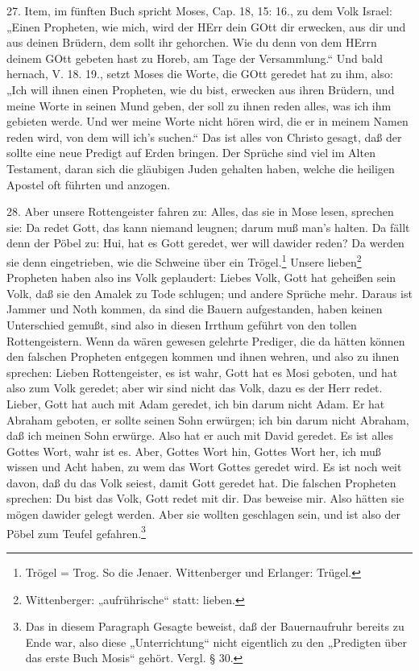 27. Item, im fünften Buch spricht Moses, Cap. 18, 15: 16., zu dem Volk Israel: „Einen Propheten, wie mich, wird der HErr dein GOtt dir erwecken, aus dir und aus deinen Brüdern, dem sollt ihr gehorchen. Wie du denn von dem HErrn deinem GOtt gebeten hast zu Horeb, am Tage der Versammlung.“ Und bald hernach, V. 18. 19., setzt Moses die Worte, die GOtt geredet hat zu ihm, also: „Ich will ihnen einen Propheten, wie du bist, erwecken aus ihren Brüdern, und meine Worte in seinen Mund geben, der soll zu ihnen reden alles, was ich ihm gebieten werde. Und wer meine Worte nicht hören wird, die er in meinem Namen reden wird, von dem will ich’s suchen.“ Das ist alles von Christo gesagt, daß der sollte eine neue Predigt auf Erden bringen. Der Sprüche sind viel im Alten
Testament, daran sich die gläubigen Juden gehalten haben, welche die heiligen Apostel oft führten und anzogen.

28. Aber unsere Rottengeister fahren zu: Alles, das sie in Mose lesen, sprechen sie: Da redet Gott, das kann niemand leugnen; darum muß man’s halten. Da fällt denn der Pöbel zu: Hui, hat es Gott geredet, wer will dawider reden? Da werden sie denn eingetrieben, wie die Schweine über ein Trögel.\footnote{Trögel = Trog. So die Jenaer. Wittenberger und Erlanger: Trügel.} Unsere lieben\footnote{Wittenberger: „aufrührische“ statt: lieben.} Propheten haben also ins Volk geplaudert: Liebes Volk, Gott hat geheißen sein Volk, daß sie den Amalek zu Tode schlugen; und andere Sprüche mehr. Daraus ist Jammer und Noth kommen, da sind die Bauern aufgestanden, haben keinen Unterschied gemußt, sind also in diesen Irrthum geführt von den tollen Rottengeistern. Wenn da wären gewesen gelehrte Prediger, die da hätten können den falschen Propheten entgegen kommen und ihnen wehren, und also zu ihnen sprechen: Lieben Rottengeister, es ist wahr, Gott hat es Mosi geboten, und hat also zum Volk geredet; aber wir sind nicht das Volk, dazu es der Herr redet. Lieber, Gott hat auch mit Adam geredet, ich bin darum nicht Adam. Er hat Abraham geboten, er sollte seinen Sohn erwürgen; ich bin darum nicht Abraham, daß ich meinen Sohn erwürge. Also hat er auch mit David geredet. Es ist alles Gottes Wort, wahr ist es. Aber, Gottes Wort hin, Gottes Wort her, ich muß wissen und Acht haben, zu wem das Wort Gottes geredet wird. Es ist noch weit davon, daß du das Volk seiest, damit Gott geredet hat. Die falschen Propheten sprechen: Du bist das Volk, Gott redet mit dir. Das beweise mir. Also hätten sie mögen dawider gelegt werden. Aber sie wollten geschlagen sein, und ist also der Pöbel zum Teufel gefahren.\footnote{Das in diesem Paragraph Gesagte beweist, daß der Bauernaufruhr bereits zu Ende war, also diese „Unterrichtung“ nicht eigentlich zu den „Predigten über das erste Buch Mosis“ gehört. Vergl. § 30.}

